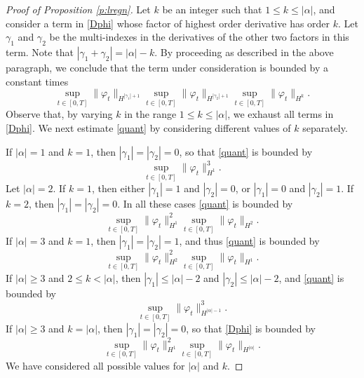 \documentclass[11pt,a4paper,draft,DIV11]{scrartcl}	%
\begin{document}
\begin{proof}[Proof of Proposition \ref{p:lregn}]
  Let $k$ be an integer such that $1 \le k \le |\alpha|$, and consider a
  term in \eqref{Dphi} whose factor of highest order derivative has order
  $k$. Let $\gamma_1$ and $\gamma_2$ be the multi-indexes in the derivatives
  of the other two factors in this term. Note that $|\gamma_1 + \gamma_2| =
  |\alpha|-k$. By proceeding as described in the above paragraph, we
  conclude that the term under consideration is bounded by a constant times
  \begin{equation} \label{quant}
    \sup_{t \in [0,T]} \| \varphi_t \|_{H^{|\gamma_1|+1}} \sup_{t \in [0,T]}
    \| \varphi_t \|_{H^{|\gamma_2|+1}} \sup_{t \in [0,T]} \| \varphi_t
    \|_{H^k}.
  \end{equation}
  Observe that, by varying $k$ in the range $1 \le k \le |\alpha|$, we
  exhaust all terms in \eqref{Dphi}. We next estimate \eqref{quant} by
  considering different values of $k$ separately. 


  If $|\alpha|=1$ and $k=1$, then $|\gamma_1|=|\gamma_2|=0$, so that
  \eqref{quant} is bounded by
  \[
    \sup_{t \in [0,T]} \| \varphi_t \|_{H^1}^3.
  \]
  Let $|\alpha|=2$. If $k=1$, then either $|\gamma_1|=1$ and $|\gamma_2|=0$,
  or $|\gamma_1|=0$ and $|\gamma_2|=1$. If $k=2$, then $|\gamma_1| =
  |\gamma_2| = 0$. In all these cases \eqref{quant} is bounded by
  \[
    \sup_{t \in [0,T]} \| \varphi_t \|_{H^1}^2 \sup_{t \in [0,T]} \|
    \varphi_t \|_{H^2}.
  \]
  If $|\alpha| = 3$ and $k = 1$, then $|\gamma_1|=|\gamma_2|=1$, and thus
  \eqref{quant} is bounded by
  \[
    \sup_{t \in [0,T]} \| \varphi_t \|_{H^2}^2 \sup_{t \in [0,T]} \|
    \varphi_t \|_{H^1}.
  \]
  If $|\alpha| \ge 3$ and $2 \le k < |\alpha|$, then $|\gamma_1| \le
  |\alpha| - 2 $ and $|\gamma_2| \le |\alpha|-2$, and \eqref{quant} is
  bounded by
  \[
    \sup_{t \in [0,T]} \| \varphi_t \|_{H^{|\alpha|-1}}^3.
  \]
  If $|\alpha| \ge 3$ and $k=|\alpha|$, then $|\gamma_1|=|\gamma_2|=0$, so
  that \eqref{Dphi} is bounded by
  \[
    \sup_{t \in [0,T]} \| \varphi_t \|_{H^1}^2 \sup_{t \in [0,T]} \|
    \varphi_t \|_{H^{|\alpha|}}.
  \]
  We have considered all possible values for $|\alpha|$ and $k$.
  

\end{proof}
\end{document}
